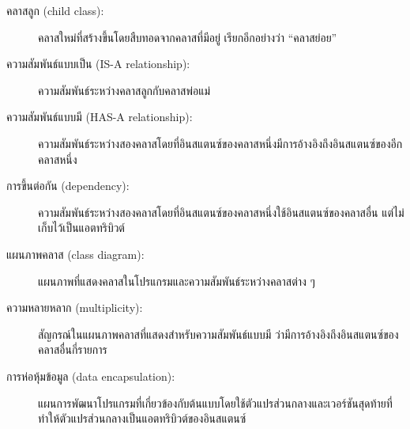 \begin{description}

\item[คลาสลูก (child class):] คลาสใหม่ที่สร้างขึ้นโดยสืบทอดจากคลาสที่มีอยู่ เรียกอีกอย่างว่า ``คลาสย่อย''


\item[ ความสัมพันธ์แบบเป็น (IS-A relationship):] ความสัมพันธ์ระหว่างคลาสลูกกับคลาสพ่อแม่


\item[ความสัมพันธ์แบบมี (HAS-A relationship):]  ความสัมพันธ์ระหว่างสองคลาสโดยที่อินสแตนซ์ของคลาสหนึ่งมีการอ้างอิงถึงอินสแตนซ์ของอีกคลาสหนึ่ง


\item[การขึ้นต่อกัน (dependency):] ความสัมพันธ์ระหว่างสองคลาสโดยที่อินสแตนซ์ของคลาสหนึ่งใช้อินสแตนซ์ของคลาสอื่น แต่ไม่เก็บไว้เป็นแอตทริบิวต์


\item[แผนภาพคลาส (class diagram):] แผนภาพที่แสดงคลาสในโปรแกรมและความสัมพันธ์ระหว่างคลาสต่าง ๆ


\item[ความหลายหลาก (multiplicity):] สัญกรณ์ในแผนภาพคลาสที่แสดงสำหรับความสัมพันธ์แบบมี ว่ามีการอ้างอิงถึงอินสแตนซ์ของคลาสอื่นกี่รายการ


\item[การห่อหุ้มข้อมูล (data encapsulation):] แผนการพัฒนาโปรแกรมที่เกี่ยวข้องกับต้นแบบโดยใช้ตัวแปรส่วนกลางและเวอร์ชันสุดท้ายที่ทำให้ตัวแปรส่วนกลางเป็นแอตทริบิวต์ของอินสแตนซ์

\end{description}


